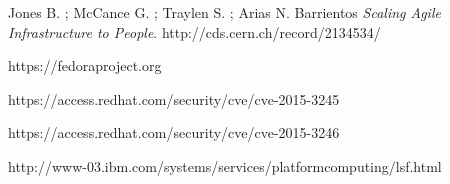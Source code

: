
\begin{thebibliography}{90}
\rhead[\fancyplain{}{\bfseries \leftmark}]{\fancyplain{}{\bfseries
\thepage}}

Jones B. ; McCance G. ; Traylen S. ; Arias N. Barrientos 
\textit{Scaling Agile Infrastructure to People}.
http://cds.cern.ch/record/2134534/

https://fedoraproject.org

https://access.redhat.com/security/cve/cve-2015-3245

https://access.redhat.com/security/cve/cve-2015-3246

http://www-03.ibm.com/systems/services/platformcomputing/lsf.html

\end{thebibliography}
